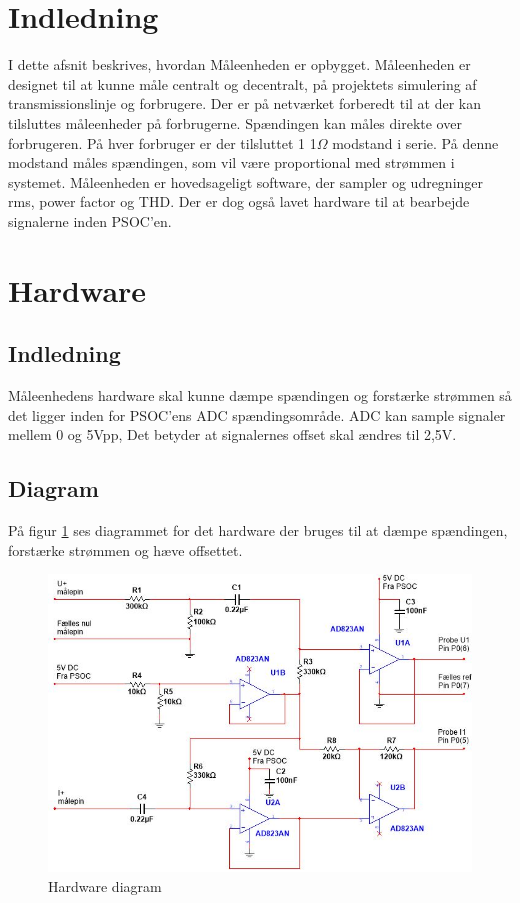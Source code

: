 
\section{Indledning}
I dette afsnit beskrives, hvordan Måleenheden er opbygget. Måleenheden er designet til at kunne måle centralt og decentralt, på projektets simulering af transmissionslinje og forbrugere. Der er på netværket forberedt til at der kan tilsluttes måleenheder på forbrugerne. Spændingen kan måles direkte over forbrugeren. På hver forbruger er der tilsluttet 1 1$\Omega$ modstand i serie. På denne modstand måles spændingen, som vil være proportional med strømmen i systemet. Måleenheden er hovedsageligt software, der sampler og udregninger rms, power factor og THD. Der er dog også lavet hardware til at bearbejde signalerne inden PSOC'en.


\section{Hardware}
\subsection{Indledning}
Måleenhedens hardware skal kunne dæmpe spændingen og forstærke strømmen så det ligger inden for PSOC'ens ADC spændingsområde. ADC kan sample signaler mellem 0 og 5Vpp, Det betyder at signalernes offset skal ændres til 2,5V.

\subsection{Diagram}
På figur \ref{fig:MaalDiagram} ses diagrammet for det hardware der bruges til at dæmpe spændingen, forstærke strømmen og hæve offsettet.

\begin{figure}[H] %
	\centering
	\includegraphics[width=\textwidth]{Figure/MaalHardware}
	\caption{Hardware diagram}
	\label{fig:MaalDiagram}
\end{figure}


